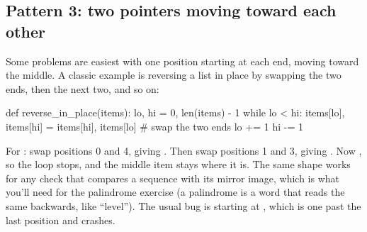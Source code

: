 \documentclass[10pt,a4paper]{article}
\begin{document}
\subsection{Pattern 3: two pointers moving toward each other}
Some problems are easiest with one position starting at each end, moving toward the middle. A classic example is reversing a list in place by swapping the two ends, then the next two, and so on:
\begin{pycode}
def reverse_in_place(items):
    lo, hi = 0, len(items) - 1
    while lo < hi:
        items[lo], items[hi] = items[hi], items[lo]   # swap the two ends
        lo += 1
        hi -= 1
\end{pycode}
For : swap positions 0 and 4, giving . Then swap positions 1 and 3, giving . Now , so the loop stops, and the middle item stays where it is. The same shape works for any check that compares a sequence with its mirror image, which is what you’ll need for the palindrome exercise (a palindrome is a word that reads the same backwards, like “level”). The usual bug is starting  at , which is one past the last position and crashes.
\setcounter{section}{6}
\end{document}
